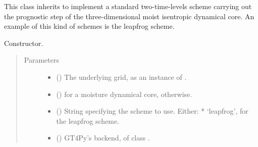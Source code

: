 \documentclass[letterpaper,10pt,english]{sphinxmanual}
\begin{document}
\begin{fulllineitems}
\label{\detokenize{api:dycore.isentropic_prognostic.TwoTimeLevelsIsentropicPrognostic}}
This class inherits {\hyperref[\detokenize{api:dycore.isentropic_prognostic.IsentropicPrognostic}]{}} to
implement a standard two-time-levels scheme carrying out the prognostic step of the three-dimensional
moist isentropic dynamical core. An example of this kind of schemes is the leapfrog scheme.

\begin{fulllineitems}
\label{\detokenize{api:dycore.isentropic_prognostic.TwoTimeLevelsIsentropicPrognostic.__init__}}
Constructor.
\begin{quote}\begin{description}
\item[{Parameters}] \leavevmode\begin{itemize}
\item {} 
 () \textendash{} The underlying grid, as an instance of {\hyperref[\detokenize{api:grids.xyz_grid.XYZGrid}]{}}.

\item {} 
 () \textendash{}  for a moisture dynamical core,  otherwise.

\item {} 
 () \textendash{} String specifying the scheme to use. Either:
* ‘leapfrog’, for the leapfrog scheme.

\item {} 
 () \textendash{} GT4Py’s backend, of class .

\end{itemize}

\end{description}\end{quote}


\end{fulllineitems}
\end{fulllineitems}
\end{document}
